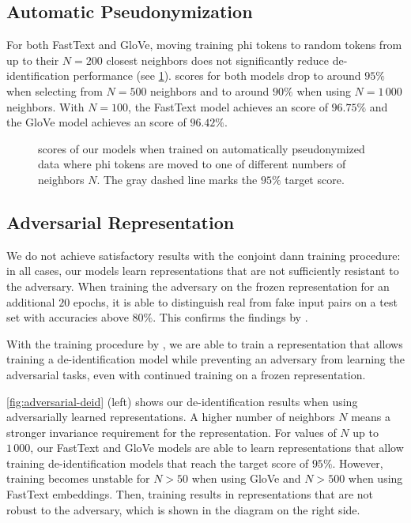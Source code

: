 \subsection{Automatic Pseudonymization}
%
For both FastText and GloVe, moving training \ac{phi} tokens to random tokens from up to their $N=200$ closest neighbors does not significantly reduce de-identification performance (see \cref{fig:auto-pseudo}).
%
\fone scores for both models drop to around $95\%$ when selecting from $N=500$ neighbors and to around $90\%$ when using $N=1\,000$ neighbors.
%
With $N=100$, the FastText model achieves an \fone score of $96.75\%$ and the GloVe model achieves an \fone score of $96.42\%$.

\begin{figure}
    \centering
    
    \caption[De-identification with automatic pseudonymization]{%
        \fone scores of our models when trained on automatically pseudonymized data where \ac{phi} tokens are moved to one of different numbers of neighbors $N$.
        The gray dashed line marks the $95\%$ target \fone score.
}\label{fig:auto-pseudo}
\end{figure}

\subsection{Adversarial Representation}
%
We do not achieve satisfactory results with the conjoint \ac{dann} training procedure: in all cases, our models learn representations that are not sufficiently resistant to the adversary.
%
When training the adversary on the frozen representation for an additional $20$ epochs, it is able to distinguish real from fake input pairs on a test set with accuracies above $80\%$.
%
This confirms the findings by \citet{elazar2018adversarial}.

%
With the training procedure by \citet{feutry2018learning}, we are able to train a representation that allows training a de-identification model while preventing an adversary from learning the adversarial tasks, even with continued training on a frozen representation.

%
\cref{fig:adversarial-deid} (left) shows our de-identification results when using adversarially learned representations.
%
A higher number of neighbors $N$ means a stronger invariance requirement for the representation.
%
For values of $N$ up to $1\,000$, our FastText and GloVe models are able to learn representations that allow training de-identification models that reach the target \fone score of $95\%$.
%
However, training becomes unstable for $N>50$ when using GloVe and $N>500$ when using FastText embeddings.
%
Then, training results in representations that are not robust to the adversary, which is shown in the diagram on the right side.

